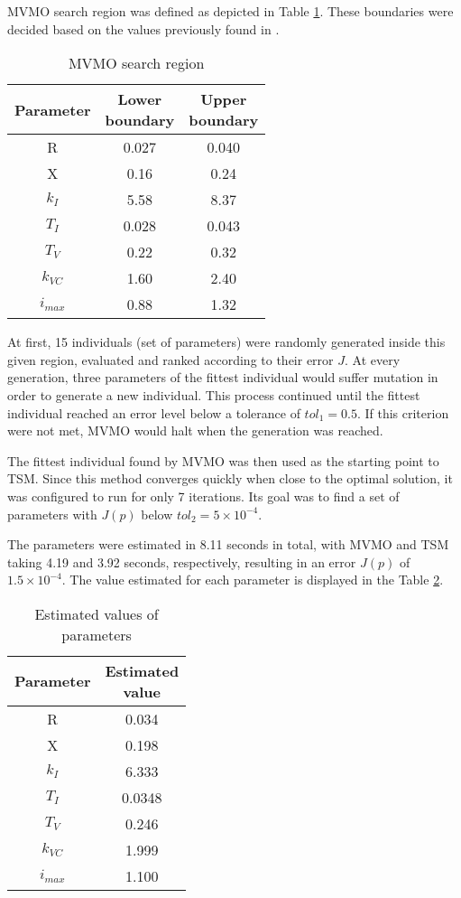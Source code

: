 MVMO search region was defined as depicted in Table \ref{tab: MVMO_boundaries}. These boundaries were decided based on the values previously found in \cite{Cari2015}.

\begin{table}[h]
	\begin{center}
		\caption{MVMO search region}
		\begin{tabular}{c|cc}
			Parameter & \shortstack{Lower \\ boundary} & \shortstack{Upper \\ boundary} \\\hline
			R & 0.027 & 0.040 \\
			X & 0.16 & 0.24 \\
			$k_{I}$ & 5.58 & 8.37 \\
			$T_{I}$ & 0.028 & 0.043 \\
			$T_{V}$ & 0.22 & 0.32 \\
			$k_{VC}$ & 1.60 & 2.40 \\
			$i_{max}$ & 0.88 & 1.32
		\end{tabular}
	\end{center}
	\label{tab: MVMO_boundaries}
\end{table}

At first, 15 individuals (set of parameters) were randomly generated inside this given region, evaluated and ranked according to their error $J$. At every generation, three parameters of the fittest individual would suffer mutation in order to generate a new individual. This process continued until the fittest individual reached an error level below a tolerance of $tol_{1} = 0.5$. If this criterion were not met, MVMO would halt when the  generation was reached.

The fittest individual found by MVMO was then used as the starting point to TSM. Since this method converges quickly when close to the optimal solution, it was configured to run for only 7 iterations. Its goal was to find a set of parameters with $J(p)$ below $tol_{2} = 5\times10^{-4}$.

The parameters were estimated in 8.11 seconds in total, with MVMO and TSM taking 4.19 and 3.92 seconds, respectively, resulting in an error $J(p)$ of $1.5\times 10^{-4}$. The value estimated for each parameter is displayed in the Table \ref{tab: results}.

\begin{table}[h]
	\begin{center}
		\caption{Estimated values of parameters}
		\begin{tabular}{c|c}
			Parameter & \shortstack{Estimated \\ value} \\\hline
			R & 0.034 \\
			X & 0.198 \\
			$k_{I}$ & 6.333 \\
			$T_{I}$ & 0.0348 \\
			$T_{V}$ & 0.246 \\
			$k_{VC}$ & 1.999 \\
			$i_{max}$ & 1.100
		\end{tabular}
	\end{center}
	\label{tab: results}
\end{table}

